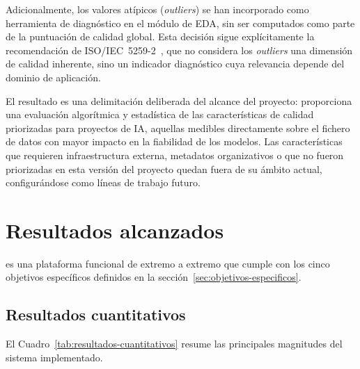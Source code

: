 Adicionalmente, los valores atípicos (\emph{outliers}) se han incorporado
como herramienta de diagnóstico en el módulo de \ac{EDA}, sin ser
computados como parte de la puntuación de calidad global.  Esta decisión
sigue explícitamente la recomendación de
\ac{ISO}/\ac{IEC}~5259-2~\citep{iso5259}, que no considera los \emph{outliers}
una dimensión de calidad inherente, sino un indicador diagnóstico cuya
relevancia depende del dominio de aplicación.

El resultado es una delimitación deliberada del alcance del proyecto:
\dataqual proporciona una evaluación algorítmica y estadística de las
características de calidad priorizadas para proyectos de \ac{IA}, aquellas
medibles directamente sobre el fichero de datos con mayor impacto en la
fiabilidad de los modelos.  Las características que requieren
infraestructura externa, metadatos organizativos o que no fueron
priorizadas en esta versión del proyecto quedan fuera de su ámbito actual,
configurándose como líneas de trabajo futuro.


\section{Resultados alcanzados}
\label{sec:resultados-alcanzados}

\dataqual es una plataforma funcional de extremo a extremo que cumple con los
cinco objetivos específicos definidos en la
sección~\ref{sec:objetivos-especificos}.

\subsection{Resultados cuantitativos}

El Cuadro~\ref{tab:resultados-cuantitativos} resume las principales
magnitudes del sistema implementado.

